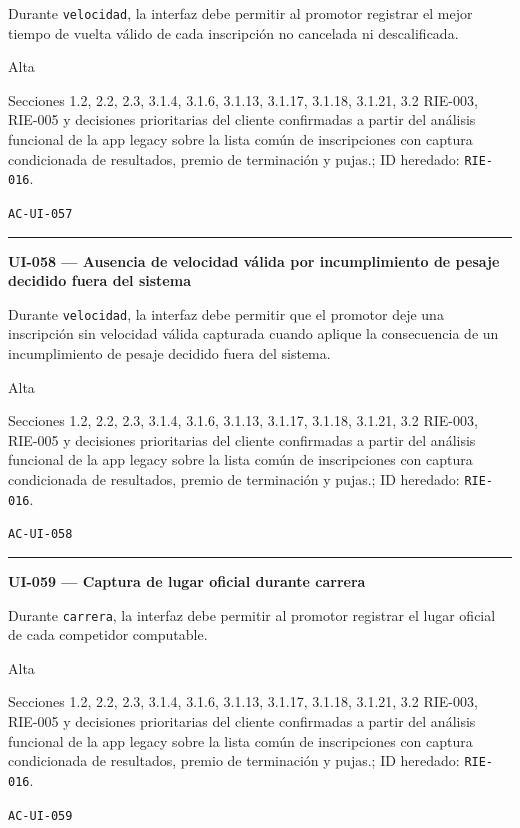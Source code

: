 \documentclass[10pt,letterpaper]{article}
\begin{document}
\begin{description}[style=nextline,leftmargin=3.15cm,labelwidth=2.8cm,font=\normalfont\bfseries]
\item[Obligación] Durante \texttt{velocidad}, la interfaz debe permitir al promotor registrar el mejor tiempo de vuelta válido de cada inscripción no cancelada ni descalificada.
\item[Prioridad] Alta
\item[Procedencia] Secciones 1.2, 2.2, 2.3, 3.1.4, 3.1.6, 3.1.13, 3.1.17, 3.1.18, 3.1.21, 3.2 RIE-003, RIE-005 y decisiones prioritarias del cliente confirmadas a partir del análisis funcional de la app legacy sobre la lista común de inscripciones con captura condicionada de resultados, premio de terminación y pujas.; ID heredado: \texttt{RIE-016}.
\item[Verificación] \texttt{AC-UI-057}
\end{description}
\vspace{0.25em}\hrule\vspace{0.65em}
\noindent\textbf{UI-058 --- Ausencia de velocidad válida por incumplimiento de pesaje decidido fuera del sistema}\par
\begin{description}[style=nextline,leftmargin=3.15cm,labelwidth=2.8cm,font=\normalfont\bfseries]
\item[Obligación] Durante \texttt{velocidad}, la interfaz debe permitir que el promotor deje una inscripción sin velocidad válida capturada cuando aplique la consecuencia de un incumplimiento de pesaje decidido fuera del sistema.
\item[Prioridad] Alta
\item[Procedencia] Secciones 1.2, 2.2, 2.3, 3.1.4, 3.1.6, 3.1.13, 3.1.17, 3.1.18, 3.1.21, 3.2 RIE-003, RIE-005 y decisiones prioritarias del cliente confirmadas a partir del análisis funcional de la app legacy sobre la lista común de inscripciones con captura condicionada de resultados, premio de terminación y pujas.; ID heredado: \texttt{RIE-016}.
\item[Verificación] \texttt{AC-UI-058}
\end{description}
\vspace{0.25em}\hrule\vspace{0.65em}
\noindent\textbf{UI-059 --- Captura de lugar oficial durante carrera}\par
\begin{description}[style=nextline,leftmargin=3.15cm,labelwidth=2.8cm,font=\normalfont\bfseries]
\item[Obligación] Durante \texttt{carrera}, la interfaz debe permitir al promotor registrar el lugar oficial de cada competidor computable.
\item[Prioridad] Alta
\item[Procedencia] Secciones 1.2, 2.2, 2.3, 3.1.4, 3.1.6, 3.1.13, 3.1.17, 3.1.18, 3.1.21, 3.2 RIE-003, RIE-005 y decisiones prioritarias del cliente confirmadas a partir del análisis funcional de la app legacy sobre la lista común de inscripciones con captura condicionada de resultados, premio de terminación y pujas.; ID heredado: \texttt{RIE-016}.
\item[Verificación] \texttt{AC-UI-059}
\end{description}
\end{document}
